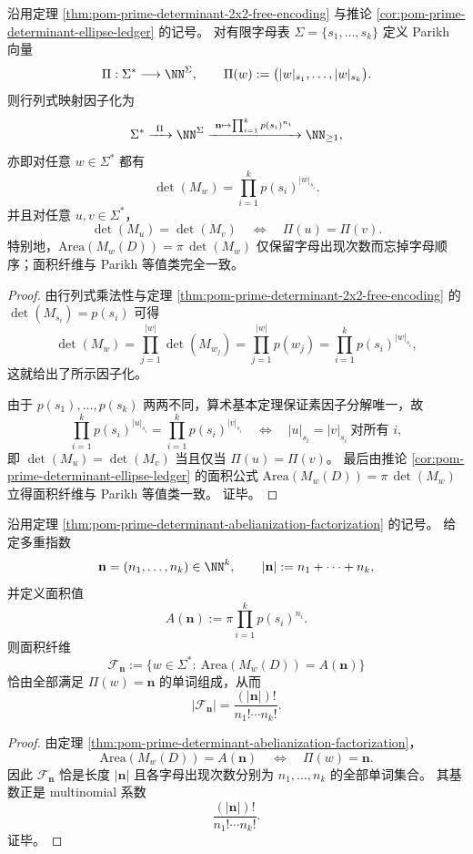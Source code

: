 \begin{theorem}[矩阵几何编码的行列式恰为自由单子的交换化像]\label{thm:pom-prime-determinant-abelianization-factorization}
沿用定理 \ref{thm:pom-prime-determinant-2x2-free-encoding} 与推论 \ref{cor:pom-prime-determinant-ellipse-ledger} 的记号。
对有限字母表 \(\Sigma=\{s_1,\dots,s_k\}\) 定义 Parikh 向量
\[
\Pi:\Sigma^\ast\longrightarrow \NN^\Sigma,
\qquad
\Pi(w):=\bigl(|w|_{s_1},\dots,|w|_{s_k}\bigr).
\]
则行列式映射因子化为
\[
\Sigma^\ast
\xrightarrow{\ \Pi\ }
\NN^\Sigma
\xrightarrow{\ \mathbf n\mapsto \prod_{i=1}^{k}p(s_i)^{n_i}\ }
\NN_{\ge 1},
\]
亦即对任意 \(w\in\Sigma^\ast\) 都有
\[
\det(M_w)=\prod_{i=1}^{k}p(s_i)^{|w|_{s_i}}.
\]
并且对任意 \(u,v\in\Sigma^\ast\)，
\[
\det(M_u)=\det(M_v)
\quad\Longleftrightarrow\quad
\Pi(u)=\Pi(v).
\]
特别地，\(\mathrm{Area}(M_w(D))=\pi\,\det(M_w)\) 仅保留字母出现次数而忘掉字母顺序；面积纤维与 Parikh 等值类完全一致。
\end{theorem}
\begin{proof}
由行列式乘法性与定理 \ref{thm:pom-prime-determinant-2x2-free-encoding} 的
\(
\det(M_{s_i})=p(s_i)
\)
可得
\[
\det(M_w)
=
\prod_{j=1}^{|w|}\det(M_{w_j})
=
\prod_{j=1}^{|w|}p(w_j)
=
\prod_{i=1}^{k}p(s_i)^{|w|_{s_i}},
\]
这就给出了所示因子化。

由于 \(p(s_1),\dots,p(s_k)\) 两两不同，算术基本定理保证素因子分解唯一，故
\[
\prod_{i=1}^{k}p(s_i)^{|u|_{s_i}}
=
\prod_{i=1}^{k}p(s_i)^{|v|_{s_i}}
\quad\Longleftrightarrow\quad
|u|_{s_i}=|v|_{s_i}\ \text{对所有 }i,
\]
即 \(\det(M_u)=\det(M_v)\) 当且仅当 \(\Pi(u)=\Pi(v)\)。
最后由推论 \ref{cor:pom-prime-determinant-ellipse-ledger} 的面积公式
\(
\mathrm{Area}(M_w(D))=\pi\,\det(M_w)
\)
立得面积纤维与 Parikh 等值类一致。
证毕。
\end{proof}

\begin{corollary}\label{cor:pom-prime-determinant-area-fiber-multinomial}
沿用定理 \ref{thm:pom-prime-determinant-abelianization-factorization} 的记号。
给定多重指数
\[
\mathbf n=(n_1,\dots,n_k)\in\NN^k,
\qquad
|\mathbf n|:=n_1+\cdots+n_k,
\]
并定义面积值
\[
A(\mathbf n):=\pi\prod_{i=1}^{k}p(s_i)^{n_i}.
\]
则面积纤维
\[
\mathcal F_{\mathbf n}
:=
\{w\in\Sigma^\ast:\ \mathrm{Area}(M_w(D))=A(\mathbf n)\}
\]
恰由全部满足 \(\Pi(w)=\mathbf n\) 的单词组成，从而
\[
|\mathcal F_{\mathbf n}|
=
\frac{(|\mathbf n|)!}{n_1!\cdots n_k!}.
\]
\end{corollary}
\begin{proof}
由定理 \ref{thm:pom-prime-determinant-abelianization-factorization}，
\[
\mathrm{Area}(M_w(D))=A(\mathbf n)
\quad\Longleftrightarrow\quad
\Pi(w)=\mathbf n.
\]
因此 \(\mathcal F_{\mathbf n}\) 恰是长度 \( |\mathbf n| \) 且各字母出现次数分别为 \(n_1,\dots,n_k\) 的全部单词集合。
其基数正是 multinomial 系数
\[
\frac{(|\mathbf n|)!}{n_1!\cdots n_k!}.
\]
证毕。
\end{proof}

